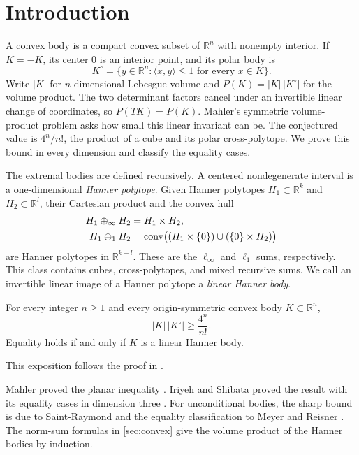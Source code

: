 \section{Introduction}\label{sec:introduction}

A convex body is a compact convex subset of $\mathbb{R}^n$ with nonempty interior. If $K=-K$, its center $0$ is an interior point, and its polar body is
\[
 K^\circ=\{y\in\mathbb{R}^n:\langle x,y\rangle\le1
                         \text{ for every }x\in K\}.
\]
Write $|K|$ for $n$-dimensional Lebesgue volume and $P(K)=|K|\,|K^\circ|$ for the volume product. The two determinant factors cancel under an invertible linear change of coordinates, so $P(TK)=P(K)$. Mahler's symmetric volume-product problem asks how small this linear invariant can be. The conjectured value is $4^n/n!$, the product of a cube and its polar cross-polytope. We prove this bound in every dimension and classify the equality cases.

The extremal bodies are defined recursively. A centered nondegenerate interval is a one-dimensional \emph{Hanner polytope}. Given Hanner polytopes $H_1\subset\mathbb{R}^k$ and $H_2\subset\mathbb{R}^l$, their Cartesian product and the convex hull
\[
 \begin{aligned}
 H_1\oplus_\infty H_2&=H_1\times H_2,\\
 H_1\oplus_1 H_2&=
 \operatorname{conv}\bigl((H_1\times\{0\})\cup(\{0\}\times H_2)\bigr)
 \end{aligned}
\]
are Hanner polytopes in $\mathbb{R}^{k+l}$. These are the $\ell_\infty$ and $\ell_1$ sums, respectively. This class contains cubes, cross-polytopes, and mixed recursive sums. We call an invertible linear image of a Hanner polytope a \emph{linear Hanner body}.

\begin{maintheorem}\label{thm:main}
For every integer $n\ge1$ and every origin-symmetric convex body $K\subset\mathbb{R}^n$,
\begin{equation}\label{eq:main-inequality}
 |K|\,|K^\circ|\ge\frac{4^n}{n!}.
\end{equation}
Equality holds if and only if $K$ is a linear Hanner body.
\end{maintheorem}

This exposition follows the proof in \cite{OpenAIMathSource}.

Mahler proved the planar inequality \cite{MahlerPlanar1939}. Iriyeh and Shibata proved the result with its equality cases in dimension three \cite[Theorem~1.1]{IriyehShibata}. For unconditional bodies, the sharp bound is due to Saint-Raymond and the equality classification to Meyer and Reisner \cite{SaintRaymond1981,Meyer1986,Reisner1987}. The norm-sum formulas in \cref{sec:convex} give the volume product of the Hanner bodies by induction.

